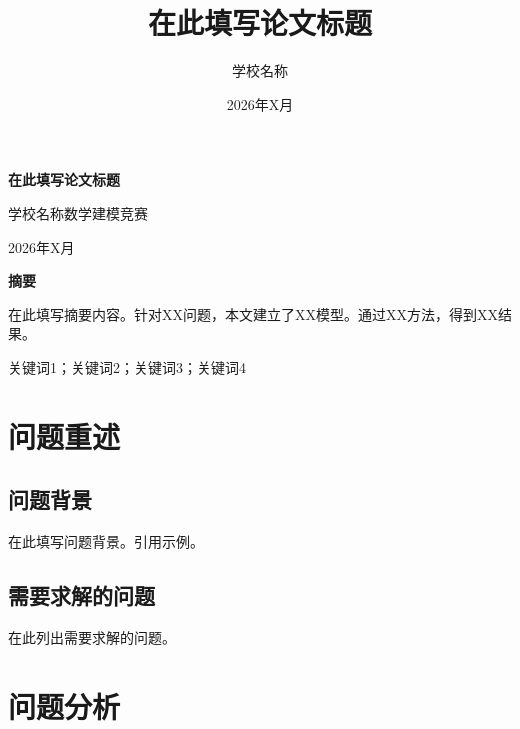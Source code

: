 \documentclass[12pt,a4paper]{article}
\title{在此填写论文标题}
\author{学校名称}
\date{2026年X月}
\begin{document}
\thispagestyle{empty}
\vspace*{7cm}
\begin{center}
  {\fontsize{22pt}{33pt}\selectfont\bfseries 在此填写论文标题\par}
  \vspace{2cm}
  {\fontsize{14pt}{21pt}\selectfont 学校名称数学建模竞赛\par}
  \vspace{1cm}
  {\normalsize 2026年X月\par}
\end{center}
\newpage

\thispagestyle{empty}
\begin{center}
  {\fontsize{14pt}{21pt}\selectfont\bfseries 摘\quad 要}
\end{center}\vspace{0.6cm}

在此填写摘要内容。针对XX问题，本文建立了XX模型。通过XX方法，得到XX结果。

关键词1；关键词2；关键词3；关键词4

\newpage

\pagestyle{plain}\setcounter{page}{1}

\section{问题重述}

\subsection{问题背景}

在此填写问题背景。引用示例\cite{Si2020}。

\subsection{需要求解的问题}

在此列出需要求解的问题。

\section{问题分析}
\end{document}
